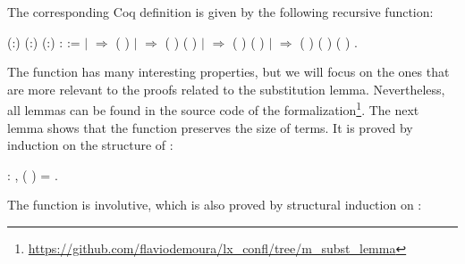 The corresponding Coq definition is given by the following recursive function: 
\begin{coqdoccode}
\coqdocemptyline
\coqdocnoindent
{}  (:) (:) (:) :  :=\coqdoceol
\coqdocindent{1.00em}
  \coqdoceol
\coqdocindent{1.00em}
\ensuremath{|}       \ensuremath{\Rightarrow}  (   )\coqdoceol
\coqdocindent{1.00em}
\ensuremath{|}     \ensuremath{\Rightarrow}  (   ) (   )\coqdoceol
\coqdocindent{1.00em}
\ensuremath{|}    \ensuremath{\Rightarrow}  (   ) (   )\coqdoceol
\coqdocindent{1.00em}
\ensuremath{|}     \ensuremath{\Rightarrow}  (   ) (   ) (   )\coqdoceol
\coqdocindent{1.00em}
.\coqdoceol
\coqdocemptyline
\coqdocemptyline
\end{coqdoccode}
The  function has many interesting properties, but we will focus on the ones that are more relevant to the proofs related to the substitution lemma. Nevertheless, all lemmas can be found in the source code of the formalization\footnote{\url{https://github.com/flaviodemoura/lx_confl/tree/m_subst_lemma}}. The next lemma shows that the  function preserves the size of terms. It is proved by induction on the structure of : 
\begin{coqdoccode}
\coqdocemptyline
\coqdocnoindent
{}  : \coqdockw{\ensuremath{\forall}}   ,  (   ) =  .\coqdoceol
\coqdocemptyline
\coqdocemptyline
\end{coqdoccode}
The  function is involutive, which is also proved by structural induction on : 
